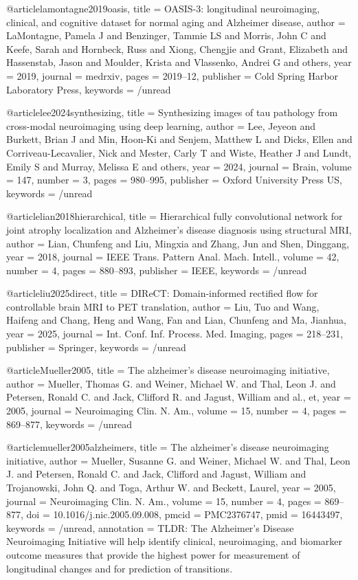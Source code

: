 @article{lamontagne2019oasis,
  title = {{{OASIS-3}}: longitudinal neuroimaging, clinical, and cognitive dataset for normal aging and {{Alzheimer}} disease},
  author = {LaMontagne, Pamela J and Benzinger, Tammie LS and Morris, John C and Keefe, Sarah and Hornbeck, Russ and Xiong, Chengjie and Grant, Elizabeth and Hassenstab, Jason and Moulder, Krista and Vlassenko, Andrei G and others},
  year = 2019,
  journal = {medrxiv},
  pages = {2019--12},
  publisher = {Cold Spring Harbor Laboratory Press},
  keywords = {/unread}
}

@article{lee2024synthesizing,
  title = {Synthesizing images of tau pathology from cross-modal neuroimaging using deep learning},
  author = {Lee, Jeyeon and Burkett, Brian J and Min, Hoon-Ki and Senjem, Matthew L and Dicks, Ellen and {Corriveau-Lecavalier}, Nick and Mester, Carly T and Wiste, Heather J and Lundt, Emily S and Murray, Melissa E and others},
  year = 2024,
  journal = {Brain},
  volume = {147},
  number = {3},
  pages = {980--995},
  publisher = {Oxford University Press US},
  keywords = {/unread}
}

@article{lian2018hierarchical,
  title = {Hierarchical fully convolutional network for joint atrophy localization and {{Alzheimer}}'s disease diagnosis using structural {{MRI}}},
  author = {Lian, Chunfeng and Liu, Mingxia and Zhang, Jun and Shen, Dinggang},
  year = 2018,
  journal = {IEEE Trans. Pattern Anal. Mach. Intell.},
  volume = {42},
  number = {4},
  pages = {880--893},
  publisher = {IEEE},
  keywords = {/unread}
}

@article{liu2025direct,
  title = {{{DIReCT}}: {{Domain-informed}} rectified flow for controllable brain {{MRI}} to {{PET}} translation},
  author = {Liu, Tuo and Wang, Haifeng and Chang, Heng and Wang, Fan and Lian, Chunfeng and Ma, Jianhua},
  year = 2025,
  journal = {Int. Conf. Inf. Process. Med. Imaging},
  pages = {218--231},
  publisher = {Springer},
  keywords = {/unread}
}

@article{Mueller2005,
  title = {The alzheimer's disease neuroimaging initiative},
  author = {Mueller, Thomas G. and Weiner, Michael W. and Thal, Leon J. and Petersen, Ronald C. and Jack, Clifford R. and Jagust, William and {al.}, et},
  year = 2005,
  journal = {Neuroimaging Clin. N. Am.},
  volume = {15},
  number = {4},
  pages = {869--877},
  keywords = {/unread}
}

@article{mueller2005alzheimers,
  title = {The alzheimer's disease neuroimaging initiative},
  author = {Mueller, Susanne G. and Weiner, Michael W. and Thal, Leon J. and Petersen, Ronald C. and Jack, Clifford and Jagust, William and Trojanowski, John Q. and Toga, Arthur W. and Beckett, Laurel},
  year = 2005,
  journal = {Neuroimaging Clin. N. Am.},
  volume = {15},
  number = {4},
  pages = {869--877},
  doi = {10.1016/j.nic.2005.09.008},
  pmcid = {PMC2376747},
  pmid = {16443497},
  keywords = {/unread},
  annotation = {TLDR: The Alzheimer's Disease Neuroimaging Initiative will help identify clinical, neuroimaging, and biomarker outcome measures that provide the highest power for measurement of longitudinal changes and for prediction of transitions.}
}

